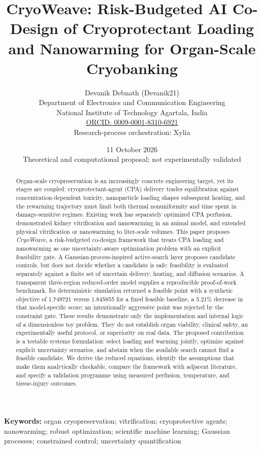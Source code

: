 \documentclass[11pt]{article}
\title{CryoWeave: Risk-Budgeted AI Co-Design of Cryoprotectant Loading and Nanowarming for Organ-Scale Cryobanking}
\author{Devanik Debnath (Devanik21)\\Department of Electronics and Communication Engineering\\National Institute of Technology Agartala, India\\\href{https://orcid.org/0009-0001-8310-6921}{ORCID: 0009-0001-8310-6921}\\[0.4em]\small Research-process orchestration: Xylia}
\date{11 October 2026 \\ \small Theoretical and computational proposal; not experimentally validated}
\begin{document}
\maketitle
\begin{abstract}
Organ-scale cryopreservation is an increasingly concrete engineering target, yet its stages are coupled: cryoprotectant-agent (CPA) delivery trades equilibration against concentration-dependent toxicity, nanoparticle loading shapes subsequent heating, and the rewarming trajectory must limit both thermal nonuniformity and time spent in damage-sensitive regimes. Existing work has separately optimized CPA perfusion, demonstrated kidney vitrification and nanowarming in an animal model, and extended physical vitrification or nanowarming to liter-scale volumes. This paper proposes \emph{CryoWeave}, a risk-budgeted co-design framework that treats CPA loading and nanowarming as one uncertainty-aware optimization problem with an explicit feasibility gate. A Gaussian-process-inspired active-search layer proposes candidate controls, but does not decide whether a candidate is safe: feasibility is evaluated separately against a finite set of uncertain delivery, heating, and diffusion scenarios. A transparent three-region reduced-order model supplies a reproducible proof-of-work benchmark. Its deterministic simulation returned a feasible point with a synthetic objective of 1.749721 versus 1.845855 for a fixed feasible baseline, a 5.21\% decrease in that model-specific score; an intentionally aggressive point was rejected by the constraint gate. These results demonstrate only the implementation and internal logic of a dimensionless toy problem. They do not establish organ viability, clinical safety, an experimentally useful protocol, or superiority on real data. The proposed contribution is a testable systems formulation: select loading and warming jointly, optimize against explicit uncertainty scenarios, and abstain when the available search cannot find a feasible candidate. We derive the reduced equations, identify the assumptions that make them analytically checkable, compare the framework with adjacent literature, and specify a validation programme using measured perfusion, temperature, and tissue-injury outcomes.
\end{abstract}

\textbf{Keywords:} organ cryopreservation; vitrification; cryoprotective agents; nanowarming; robust optimization; scientific machine learning; Gaussian processes; constrained control; uncertainty quantification
\end{document}
